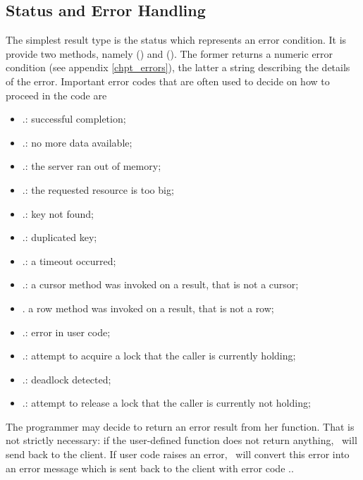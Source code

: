 \subsection{Status and Error Handling}
The simplest result type is
the status which represents an error condition.
It is provide two methods, namely
() and ().
The former returns a numeric error condition (see appendix
\ref{chpt_errors}), the latter a string
describing the details of the error.
Important error codes that are often used to
decide on how to proceed in the code are

\begin{itemize}
\item {}.: successful completion;
\item {}.: no more data available;
\item {}.: the server ran out of memory;
\item {}.: the requested resource is too big;
\item {}.: key not found;
\item {}.: duplicated key;
\item {}.: a timeout occurred;
\item {}.: a cursor method was invoked on a result,
                            that is not a cursor;
\item {}. a row method was invoked on a result,
                            that is not a row;
\item {}.: error in user code;
\item {}.: attempt to acquire a lock that the caller
                             is currently holding;
\item {}.: deadlock detected;
\item {}.: attempt to release a lock that the caller
                              is currently not holding;
\end{itemize}

The programmer may decide to return an error result from
her function. That is not strictly necessary:
if the user-defined function does not return anything,
\nowdb\ will send  back to the client.
If user code raises an error, \nowdb\ will convert
this error into an error message which is sent back
to the client with error code ..

